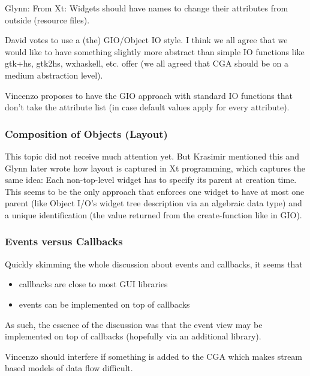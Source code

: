 \documentclass{article}
\begin{document}
Glynn: From Xt: Widgets should have names to change their attributes
from outside (resource files).

David votes to use a (the) GIO/Object IO style. I think we all agree
that we would like to have something slightly more abstract than
simple IO functions like gtk+hs, gtk2hs, wxhaskell, etc. offer (we all
agreed that CGA should be on a medium abstraction level).

Vincenzo proposes to have the GIO approach with standard IO functions
that don't take the attribute list (in case default values apply for
every attribute).

\subsubsection{\label{secParentAsParameter} Composition of Objects
  (Layout)}

This topic did not receive much attention yet. But Krasimir mentioned
this and Glynn later wrote how layout is captured in Xt programming,
which captures the same idea: Each non-top-level widget has to specify
its parent at creation time. This seems to be the only approach that
enforces one widget to have at most one parent (like Object I/O's
widget tree description via an algebraic data type) and a unique
identification (the value returned from the create-function like in
GIO).

\subsubsection{Events versus Callbacks}
Quickly skimming the whole discussion about events and callbacks, it
seems that
\begin{itemize}
\item callbacks are close to most GUI libraries
\item events can be implemented on top of callbacks
\end{itemize}
As such, the essence of the discussion was that the event view may be
implemented on top of callbacks (hopefully via an additional library).

Vincenzo should interfere if something is added to the CGA which makes
stream based models of data flow difficult.
\end{document}
